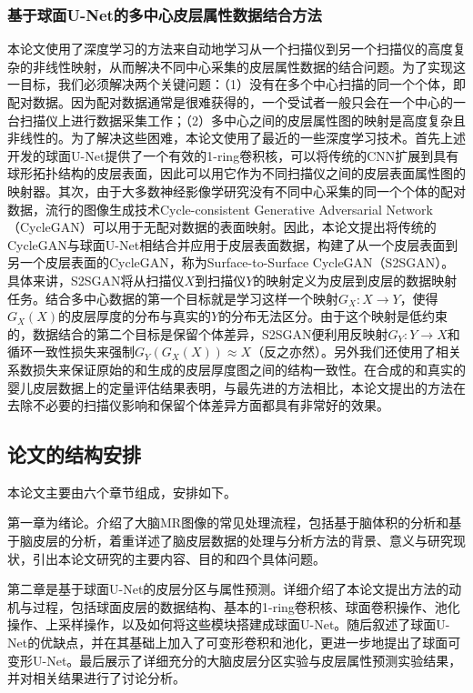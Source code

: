 \subsubsection{基于球面U-Net的多中心皮层属性数据结合方法}
本论文使用了深度学习的方法来自动地学习从一个扫描仪到另一个扫描仪的高度复杂的非线性映射，从而解决不同中心采集的皮层属性数据的结合问题。为了实现这一目标，我们必须解决两个关键问题：（1）没有在多个中心扫描的同一个个体，即配对数据。因为配对数据通常是很难获得的，一个受试者一般只会在一个中心的一台扫描仪上进行数据采集工作；（2）多中心之间的皮层属性图的映射是高度复杂且非线性的。为了解决这些困难，本论文使用了最近的一些深度学习技术\cite{zhu2017unpaired,zhao2019spherical_ipmi}。首先上述开发的球面U-Net提供了一个有效的1-ring卷积核，可以将传统的CNN扩展到具有球形拓扑结构的皮层表面，因此可以用它作为不同扫描仪之间的皮层表面属性图的映射器。其次，由于大多数神经影像学研究没有不同中心采集的同一个个体的配对数据，流行的图像生成技术Cycle-consistent Generative Adversarial Network（CycleGAN）\cite{zhu2017unpaired}可以用于无配对数据的表面映射。因此，本论文提出将传统的CycleGAN与球面U-Net相结合并应用于皮层表面数据，构建了从一个皮层表面到另一个皮层表面的CycleGAN，称为Surface-to-Surface CycleGAN（S2SGAN）。具体来讲，S2SGAN将从扫描仪$X$到扫描仪$Y$的映射定义为皮层到皮层的数据映射任务。结合多中心数据的第一个目标就是学习这样一个映射$G_X: X\rightarrow Y$，使得$G_X(X)$的皮层厚度的分布与真实的$Y$的分布无法区分。由于这个映射是低约束的，数据结合的第二个目标是保留个体差异，S2SGAN便利用反映射$G_Y: Y\rightarrow X$和循环一致性损失来强制$G_Y(G_X(X))\approx X$（反之亦然）。另外我们还使用了相关系数损失来保证原始的和生成的皮层厚度图之间的结构一致性。在合成的和真实的婴儿皮层数据上的定量评估结果表明，与最先进的方法相比，本论文提出的方法在去除不必要的扫描仪影响和保留个体差异方面都具有非常好的效果。


\subsection{论文的结构安排}
本论文主要由六个章节组成，安排如下。

第一章为绪论。介绍了大脑MR图像的常见处理流程，包括基于脑体积的分析和基于脑皮层的分析，着重详述了脑皮层数据的处理与分析方法的背景、意义与研究现状，引出本论文研究的主要内容、目的和四个具体问题。

第二章是基于球面U-Net的皮层分区与属性预测。详细介绍了本论文提出方法的动机与过程，包括球面皮层的数据结构、基本的1-ring卷积核、球面卷积操作、池化操作、上采样操作，以及如何将这些模块搭建成球面U-Net。随后叙述了球面U-Net的优缺点，并在其基础上加入了可变形卷积和池化，更进一步地提出了球面可变形U-Net。最后展示了详细充分的大脑皮层分区实验与皮层属性预测实验结果，并对相关结果进行了讨论分析。

